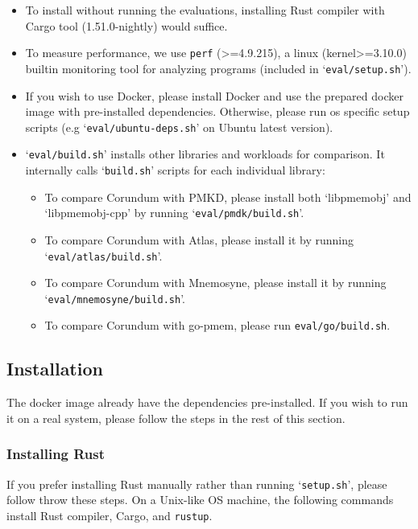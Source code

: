{\begin{itemize}
  \item To install \This{} without running the evaluations, installing Rust compiler with Cargo tool (1.51.0-nightly) would suffice.
  \item To measure performance, we use \verb+perf+ (>=4.9.215), a linux (kernel>=3.10.0) builtin monitoring tool for analyzing programs (included in `\verb+eval/setup.sh+').
  \item If you wish to use Docker, please install Docker and use the prepared docker image with pre-installed dependencies. Otherwise, please run os specific setup scripts (e.g `\verb+eval/ubuntu-deps.sh+' on Ubuntu latest version).
  \item `\verb+eval/build.sh+' installs other libraries and workloads for comparison. It internally calls `\verb+build.sh+' scripts for each individual library:
  \begin{itemize}
    \item To compare Corundum with PMKD, please install both `libpmemobj' and `libpmemobj-cpp' by running `\verb+eval/pmdk/build.sh+'.
    \item To compare Corundum with Atlas, please install it by running `\verb+eval/atlas/build.sh+'.
    \item To compare Corundum with Mnemosyne, please install it by running `\verb+eval/mnemosyne/build.sh+'.
    \item To compare Corundum with go-pmem, please run \verb+eval/go/build.sh+.
  \end{itemize}
\end{itemize}

\subsection{Installation}

The docker image already have the dependencies pre-installed. If you wish to run it on a real system, please follow the steps in the rest of this section.

\subsubsection{Installing Rust}

If you prefer installing Rust manually rather than running `\verb+setup.sh+', please follow throw these steps.
On a Unix-like OS machine, the following commands
install Rust compiler, Cargo, and \verb+rustup+. 

}
